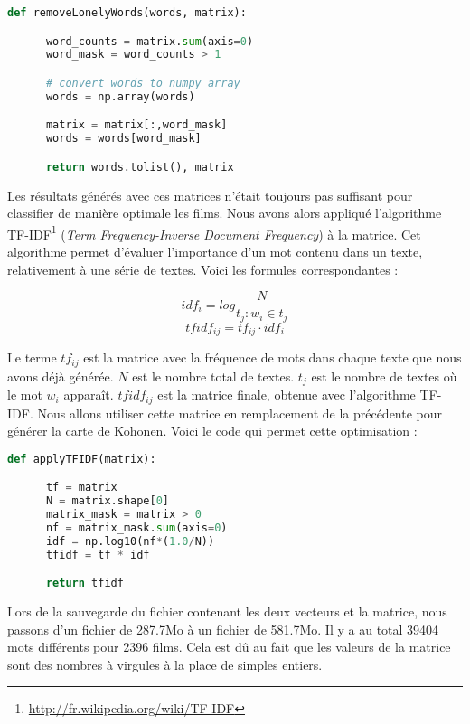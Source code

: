 \begin{lstlisting}[language=python]
  def removeLonelyWords(words, matrix):

      word_counts = matrix.sum(axis=0)
      word_mask = word_counts > 1

      # convert words to numpy array
      words = np.array(words)

      matrix = matrix[:,word_mask]
      words = words[word_mask]

      return words.tolist(), matrix
\end{lstlisting}

Les résultats générés avec ces matrices n'était toujours pas suffisant pour classifier de manière optimale les films. Nous avons alors appliqué l'algorithme TF-IDF\footnote{\url{http://fr.wikipedia.org/wiki/TF-IDF}} (\textit{Term Frequency-Inverse Document Frequency}) à la matrice. Cet algorithme permet d'évaluer l'importance d'un mot contenu dans un texte, relativement à une série de textes. Voici les formules correspondantes :

\[idf_i = log\frac{N}{t_j : w_i \in t_j}\]
\[tfidf_{ij} = tf_{ij} \cdot idf_i\]

Le terme $tf_{ij}$ est la matrice avec la fréquence de mots dans chaque texte que nous avons déjà générée. $N$ est le nombre total de textes. $t_j$ est le nombre de textes où le mot $w_i$ apparaît. $tfidf_{ij}$ est la matrice finale, obtenue avec l'algorithme TF-IDF. Nous allons utiliser cette matrice en remplacement de la précédente pour générer la carte de Kohonen. Voici le code qui permet cette optimisation : \\

\begin{lstlisting}[language=python] 
 def applyTFIDF(matrix):

      tf = matrix
      N = matrix.shape[0]
      matrix_mask = matrix > 0
      nf = matrix_mask.sum(axis=0)
      idf = np.log10(nf*(1.0/N))
      tfidf = tf * idf

      return tfidf
\end{lstlisting}

Lors de la sauvegarde du fichier contenant les deux vecteurs et la matrice, nous passons d'un fichier de 287.7Mo à un fichier de 581.7Mo. Il y a au total 39404 mots différents pour 2396 films. Cela est dû au fait que les valeurs de la matrice sont des nombres à virgules à la place de simples entiers.

